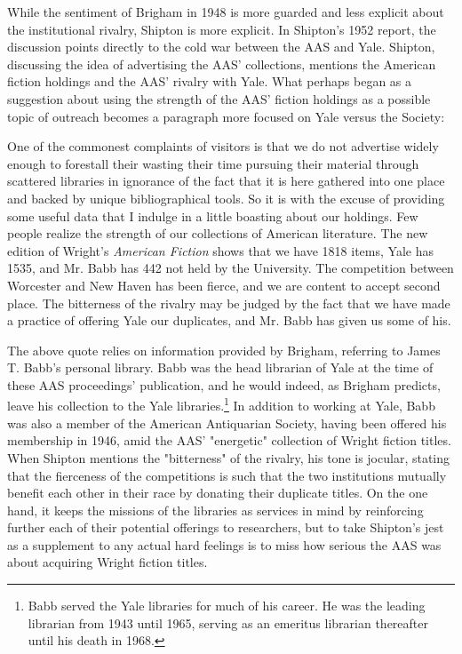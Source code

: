 While the sentiment of Brigham in 1948 is more guarded  and less explicit about the institutional rivalry, Shipton is more explicit. In Shipton's 1952 report, the discussion points directly to the cold war between the AAS and Yale. Shipton, discussing the idea of advertising the AAS' collections, mentions the American fiction holdings and the AAS' rivalry with Yale. What perhaps began as a suggestion about using the strength of the AAS' fiction holdings as a possible topic of outreach becomes a paragraph more focused on Yale versus the Society:
\begin{displayquote}
One of the commonest complaints of visitors is that we
do not advertise widely enough to forestall their wasting their time pursuing their material through scattered libraries in ignorance of the fact that it is here gathered into one place and backed by unique bibliographical tools. So it is with the excuse of providing some useful data that I indulge in a little boasting about our holdings. Few people realize the strength of our collections of American literature. The new edition of Wright's \textit{American Fiction} shows that we have 1818 items, Yale has 1535, and Mr. Babb has 442 not held by the University. The competition between Worcester and New Haven has been fierce, and we are content to accept second place. The bitterness of the rivalry may be judged by the fact that we have made a practice of offering Yale our duplicates, and Mr. Babb has given us some of his.\autocite[147]{clifford_k._shipton_report_1952}
\end{displayquote}

The above quote relies on information provided by Brigham, referring to James T. Babb's personal library. Babb was the head librarian of Yale at the time of these AAS proceedings' publication, and he would indeed, as Brigham predicts, leave his collection to the Yale libraries.\footnote{Babb served the Yale libraries for much of his career. He was the leading librarian from 1943 until 1965, serving as an emeritus librarian thereafter until his death in 1968.} In addition to working at Yale, Babb was also a member of the American Antiquarian Society, having been offered his membership in 1946, amid the AAS' "energetic" collection of Wright fiction titles. When Shipton mentions the "bitterness" of the rivalry, his tone is jocular, stating that the fierceness of the competitions is such that the two institutions mutually benefit each other in their race by donating their duplicate titles. On the one hand, it keeps the missions of the libraries as services in mind by reinforcing further each of their potential offerings to researchers, but to take Shipton's jest as a supplement to any actual hard feelings is to miss how serious the AAS was about acquiring Wright fiction titles. 

